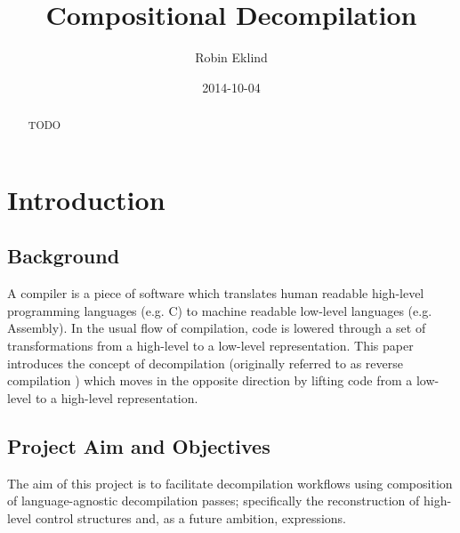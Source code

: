 \documentclass[12pt, a4paper]{article}
\title{Compositional Decompilation} %
\author{Robin Eklind}
\date{2014-10-04}
\begin{document}
\maketitle

\begin{abstract}
TODO
\end{abstract}

\pagebreak

\tableofcontents

\pagebreak



\section{Introduction}


\subsection{Background}

A compiler is a piece of software which translates human readable high-level
programming languages (e.g. C) to machine readable low-level languages (e.g.
Assembly). In the usual flow of compilation, code is lowered through a set of
transformations from a high-level to a low-level representation. This paper
introduces the concept of decompilation (originally referred to as reverse
compilation \cite{rev_comp}) which moves in the opposite direction by lifting
code from a low-level to a high-level representation.


\subsection{Project Aim and Objectives}

The aim of this project is to facilitate decompilation workflows using
composition of language-agnostic decompilation passes; specifically the
reconstruction of high-level control structures and, as a future ambition,
expressions.
\end{document}

